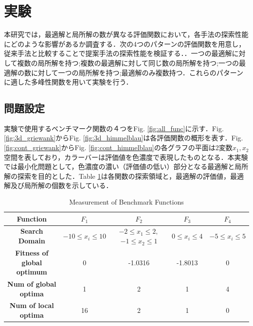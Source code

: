 \documentclass{jarticle}
\begin{document}


\section{実験}
本研究では，最適解と局所解の数が異なる評価関数において，各手法の探索性能にどのような影響があるか調査する．次の4つのパターンの評価関数を用意し，従来手法と比較することで提案手法の探索性能を検証する．．一つの最適解に対して複数の局所解を持つ;複数の最適解に対して同じ数の局所解を持つ;一つの最適解の数に対して一つの局所解を持つ;最適解のみ複数持つ．これらのパターンに適した多峰性関数を用いて実験を行う．
\subsection{問題設定}
実験で使用するベンチマーク関数の４つをFig. \ref{fig:all_func}に示す．Fig. \ref{fig:3d_griewank}からFig. \ref{fig:3d_himmelblau}は各評価関数の概形を表す．Fig. \ref{fig:cont_griewank}からFig. \ref{fig:cont_himmelblau}の各グラフの平面は2変数$x_1,x_2$空間を表しており，カラーバーは評価値を色濃度で表現したものとなる．本実験では最小化問題として，色濃度の濃い（評価値の低い）部分となる最適解と局所解の探索を目的とした．Table \ref{tab1}は各関数の探索領域と，最適解の評価値，最適解及び局所解の個数を示している．

\begin{table}[t]
\caption{Measurement of Benchmark Functions}
\begin{center}
\begin{tabular}{c|c|c|c|c}
\hline
\textbf{Function} & ${F_1}$ & ${F_2}$ & ${F_3}$ & ${F_4}$  \\
\hline
\textbf{Search Domain} & $-10 \leq x_i \leq 10$ & $-2 \leq x_1 \leq 2,$ $-1 \leq x_2 \leq 1$ & $0 \leq x_i \leq 4$ & $-5 \leq x_i \leq 5$  \\
\hline
\textbf{Fitness of global optimum} & 0 & -1.0316 & -1.8013 & 0  \\
\hline
\textbf{Num of global optima} & 1 & 2 & 1 & 4  \\
\hline
\textbf{Num of local optima} &  16 & 2 & 1 & 0  \\
\hline
\end{tabular}
\label{tab1}
\end{center}
\end{table}
\end{document}
